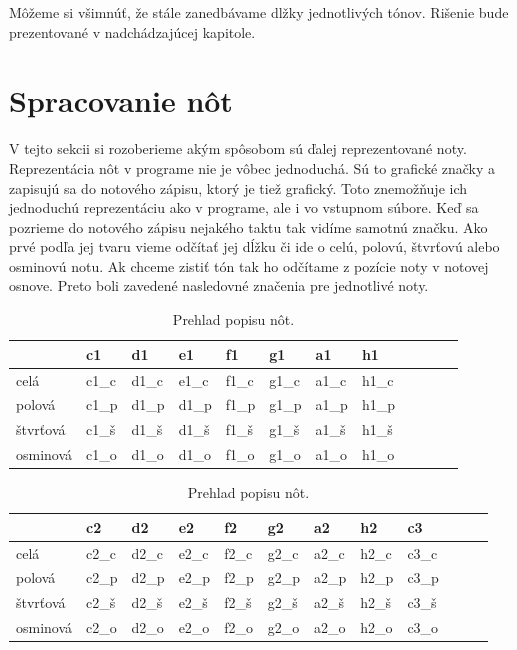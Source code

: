 Môžeme si všimnúť, že stále zanedbávame dlžky jednotlivých tónov. Rišenie bude prezentované v nadchádzajúcej kapitole.

\section{Spracovanie nôt}
V tejto sekcii si rozoberieme akým spôsobom sú ďalej reprezentované noty. Reprezentácia nôt v programe nie je vôbec jednoduchá. Sú to grafické značky a zapisujú sa do notového zápisu, ktorý je tiež grafický. Toto znemožňuje ich jednoduchú reprezentáciu ako v programe, ale i vo vstupnom súbore. Keď sa pozrieme do notového zápisu nejakého taktu tak vidíme samotnú značku. Ako prvé podľa jej tvaru vieme odčítať jej dĺžku či ide o celú, polovú, štvrťovú alebo osminovú notu. Ak chceme zistiť tón tak ho odčítame z pozície noty v notovej osnove. Preto boli zavedené nasledovné značenia pre jednotlivé noty.

\begin{table}[!ht]
\label{tab:tone}
    \centering
    \begin{tabular}{|l|l|l|l|l|l|l|l|l|l|l|l}
    \hline
        ~ & c1 & d1 & e1 & f1 & g1 & a1 & h1 \\ \hline
        celá & c1\_c & d1\_c & e1\_c & f1\_c & g1\_c & a1\_c & h1\_c \\ \hline
        polová & c1\_p & d1\_p & d1\_p & f1\_p & g1\_p & a1\_p & h1\_p \\ \hline
        štvrťová & c1\_š & d1\_š & d1\_š & f1\_š & g1\_š & a1\_š & h1\_š \\ \hline
        osminová & c1\_o & d1\_o & d1\_o & f1\_o & g1\_o & a1\_o & h1\_o  \\ \hline
    \end{tabular}
    \caption{\label{tab:notes} Prehlad popisu nôt.}
\end{table}
\begin{table}[!ht]
    \centering
    \begin{tabular}{|l|l|l|l|l|l|l|l|l|l|l|l}
    \hline
        ~ & c2 & d2 & e2 & f2 & g2 & a2 & h2 & c3 \\ \hline
        celá & c2\_c & d2\_c & e2\_c & f2\_c & g2\_c & a2\_c & h2\_c & c3\_c \\ \hline
        polová & c2\_p & d2\_p & e2\_p & f2\_p & g2\_p & a2\_p & h2\_p & c3\_p \\ \hline
        štvrťová & c2\_š & d2\_š & e2\_š & f2\_š & g2\_š & a2\_š & h2\_š & c3\_š \\ \hline
        osminová & c2\_o & d2\_o & e2\_o & f2\_o & g2\_o & a2\_o & h2\_o & c3\_o \\ \hline
    \end{tabular}
    \caption{\label{tab:notes1} Prehlad popisu nôt.}
\end{table}

